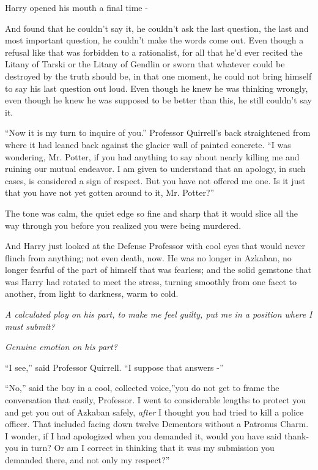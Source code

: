 Harry opened his mouth a final time -

And found that he couldn't say it, he couldn't ask the last question,
the last and most important question, he couldn't make the words come
out. Even though a refusal like that was forbidden to a rationalist, for
all that he'd ever recited the Litany of Tarski or the Litany of Gendlin
or sworn that whatever could be destroyed by the truth should be, in
that one moment, he could not bring himself to say his last question out
loud. Even though he knew he was thinking wrongly, even though he knew
he was supposed to be better than this, he still couldn't say it.

``Now it is my turn to inquire of you.'' Professor Quirrell's back
straightened from where it had leaned back against the glacier wall of
painted concrete. ``I was wondering, Mr. Potter, if you had anything to
say about nearly killing me and ruining our mutual endeavor. I am given
to understand that an apology, in such cases, is considered a sign of
respect. But you have not offered me one. Is it just that you have not
yet gotten around to it, Mr. Potter?''

The tone was calm, the quiet edge so fine and sharp that it would slice
all the way through you before you realized you were being murdered.

And Harry just looked at the Defense Professor with cool eyes that would
never flinch from anything; not even death, now. He was no longer in
Azkaban, no longer fearful of the part of himself that was fearless; and
the solid gemstone that was Harry had rotated to meet the stress,
turning smoothly from one facet to another, from light to darkness, warm
to cold.

\emph{A calculated ploy on his part, to make me feel guilty, put me in a
position where I must submit?}

\emph{Genuine emotion on his part?}

``I see,'' said Professor Quirrell. ``I suppose that answers -''

``No,'' said the boy in a cool, collected voice,''you do not get to
frame the conversation that easily, Professor. I went to considerable
lengths to protect you and get you out of Azkaban safely, \emph{after} I
thought you had tried to kill a police officer. That included facing
down twelve Dementors without a Patronus Charm. I wonder, if I had
apologized when you demanded it, would you have said thank-you in turn?
Or am I correct in thinking that it was my submission you demanded
there, and not only my respect?''


